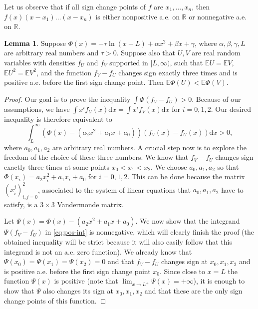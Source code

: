 \documentclass[11pt]{amsart}
\newcommand{\dd}{\mathrm{d}}
\newcommand{\1}{\mathbf{1}}
\newcommand{\R}{\mathbb{R}}
\newcommand{\E}{\mathbb{E}}
\theoremstyle{definition}
\newtheorem{lemma}{Lemma}
\theoremstyle{definition}
\theoremstyle{remark}
\begin{document}
Let us observe that if all sign change points of $f$ are $x_1, \dots, x_n$, then $f(x)(x - x_1)\dots(x - x_n)$ is either nonpositive a.e. on $\R$ or nonnegative a.e. on $\R$.

\begin{lemma}\label{lem:method-of-int-dens}
Suppose $\Phi(x)=-\tau \ln(x-L) + \alpha x^2 + \beta x + \gamma$, where $\alpha, \beta, \gamma, L$ are arbitrary real numbers and $\tau>0$. Suppose also that $U,V$ are real random variables with densities $f_U$ and $f_V$ supported in $[L,\infty)$, such that $\E U= \E V$, $\E U^2= \E V^2$, and the function $f_V-f_U$ changes sign exactly three times and is positive a.e. before the first sign change point. Then
$\E \Phi(U) < \E \Phi(V)$.    
\end{lemma}

\begin{proof}
Our goal is to prove the inequality $\int \Phi (f_V-f_U) > 0$. Because of our assumptions, we have $\int x^i f_U(x)\dd x = \int x^i f_V(x)\dd x$ for $i=0,1,2$. Our desired inequality is therefore equivalent to
\begin{equation}\label{eq:pos-int}
	\int_L^{\infty} (\Phi(x) - (a_2 x^2 + a_1 x + a_0))(f_V(x)-f_U(x)) \dd x > 0,
\end{equation}
where $a_0, a_1, a_2$ are arbitrary real numbers. A crucial step now is to explore the freedom of the choice of these three numbers. We know that $f_V-f_U$ changes sign exactly three times at some points $x_0<x_1<x_2$.  We choose $a_0,a_1,a_2$ so that $\Phi(x_i)=a_2 x_i^2 + a_1 x_i+a_0$ for $i=0,1,2$. This can be done because the matrix $(x_i^j)_{i,j=0}^2$, associated to the system of linear equations that $a_0,a_1,a_2$ have to satisfy, is a $3 \times 3$  Vandermonde matrix. 

Let $\Psi(x)=\Phi(x) - (a_2 x^2 + a_1 x + a_0)$. We now show that the integrand $\Psi(f_V-f_U)$ in \eqref{eq:pos-int} is nonnegative, which will clearly finish the proof (the obtained inequality will be strict because it will also easily follow that this integrand is not an a.e. zero function).  We already know that $\Psi(x_0)=\Psi(x_1)=\Psi(x_2)=0$ and that $f_V-f_U$ changes sign at $x_0, x_1, x_2$ and is positive a.e. before the first sign change point $x_0$. Since close to $x=L$ the function $\Psi(x)$ is positive (note that $\lim_{x \to L^+} \Psi(x)=+\infty$), it is enough to show that $\Psi$ also changes its sign at $x_0, x_1, x_2$ and that these are the only sign change points of this function. 


\end{proof}
\end{document}

